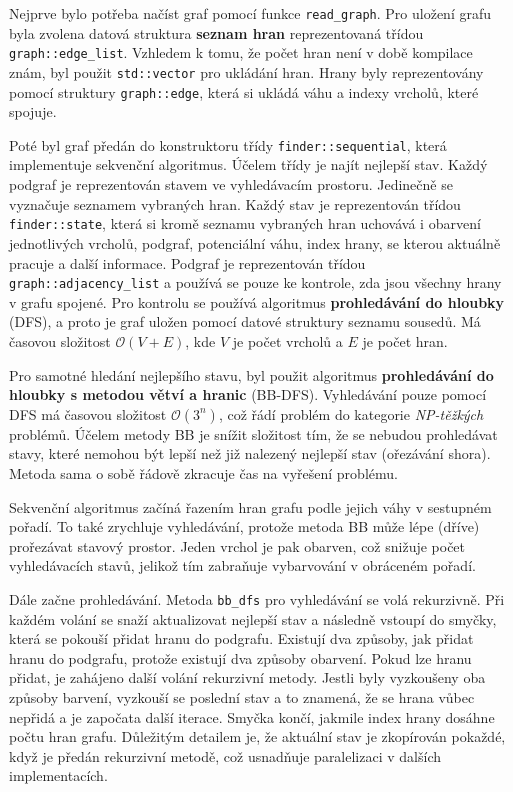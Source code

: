 Nejprve bylo potřeba načíst graf pomocí funkce \texttt{read\_graph}.
Pro uložení grafu byla zvolena datová struktura \textbf{seznam hran} reprezentovaná třídou \texttt{graph::edge\_list}.
Vzhledem k tomu, že počet hran není v době kompilace znám, byl použit \texttt{std::vector} pro ukládání hran.
Hrany byly reprezentovány pomocí struktury \texttt{graph::edge}, která si ukládá váhu a indexy vrcholů, které spojuje.

Poté byl graf předán do konstruktoru třídy \texttt{finder::sequential}, která implementuje sekvenční algoritmus.
Účelem třídy je najít nejlepší stav.
Každý podgraf je reprezentován stavem ve vyhledávacím prostoru.
Jedinečně se vyznačuje seznamem vybraných hran.
Každý stav je reprezentován třídou \texttt{finder::state}, která si kromě seznamu vybraných hran uchovává i obarvení jednotlivých vrcholů, podgraf, potenciální váhu, index hrany, se kterou aktuálně pracuje a další informace.
Podgraf je reprezentován třídou \texttt{graph::adjacency\_list} a používá se pouze ke kontrole, zda jsou všechny hrany v grafu spojené.
Pro kontrolu se používá algoritmus \textbf{prohledávání do hloubky} (DFS), a proto je graf uložen pomocí datové struktury seznamu sousedů.
Má časovou složitost \(\mathcal{O}(V+E)\), kde \(V\) je počet vrcholů a \(E\) je počet hran.

Pro samotné hledání nejlepšího stavu, byl použit algoritmus \textbf{prohledávání do hloubky s metodou větví a hranic} (BB-DFS).
Vyhledávání pouze pomocí DFS má časovou složitost \(\mathcal{O}(3^n)\), což řádí problém do kategorie \textit{NP-těžkých} problémů.
Účelem metody BB je snížit složitost tím, že se nebudou prohledávat stavy, které nemohou být lepší než již nalezený nejlepší stav (ořezávání shora).
Metoda sama o sobě řádově zkracuje čas na vyřešení problému.

Sekvenční algoritmus začíná řazením hran grafu podle jejich váhy v sestupném pořadí.
To také zrychluje vyhledávání, protože metoda BB může lépe (dříve) prořezávat stavový prostor.
Jeden vrchol je pak obarven, což snižuje počet vyhledávacích stavů, jelikož tím zabraňuje vybarvování v obráceném pořadí.

Dále začne prohledávání.
Metoda \texttt{bb\_dfs} pro vyhledávání se volá rekurzivně.
Při každém volání se snaží aktualizovat nejlepší stav a následně vstoupí do smyčky, která se pokouší přidat hranu do podgrafu.
Existují dva způsoby, jak přidat hranu do podgrafu, protože existují dva způsoby obarvení.
Pokud lze hranu přidat, je zahájeno další volání rekurzivní metody.
Jestli byly vyzkoušeny oba způsoby barvení, vyzkouší se poslední stav a to znamená, že se hrana vůbec nepřidá a je započata další iterace.
Smyčka končí, jakmile index hrany dosáhne počtu hran grafu.
Důležitým detailem je, že aktuální stav je zkopírován pokaždé, když je předán rekurzivní metodě, což usnadňuje paralelizaci v dalších implementacích.

